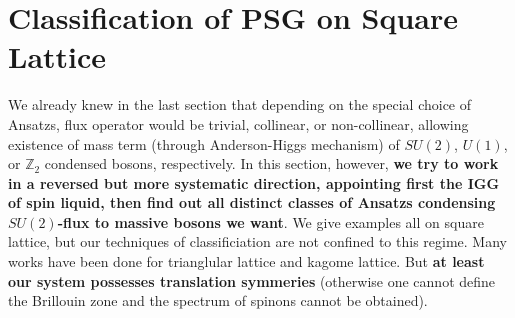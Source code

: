 \documentclass[10pt,nofootinbib]{revtex4}
\begin{document}
\section{Classification of PSG on Square Lattice}
	We already knew in the last section that depending on the special choice of Ansatzs, flux operator would be trivial, collinear, or non-collinear, allowing existence of mass term (through Anderson-Higgs mechanism) of $SU(2)$, $U(1)$, or $\mathbb{Z}_2$ condensed bosons, respectively. In this section, however, \textbf{we try to work in a reversed but more systematic direction, appointing first the IGG of spin liquid, then find out all distinct classes of Ansatzs condensing $SU(2)$-flux to massive bosons we want}. We give examples all on square lattice, but our techniques of classificiation are not confined to this regime. Many works have been done for trianglular lattice and kagome lattice. But \textbf{at least our system possesses translation symmeries} (otherwise one cannot define the Brillouin zone and the spectrum of spinons cannot be obtained).
\end{document}
